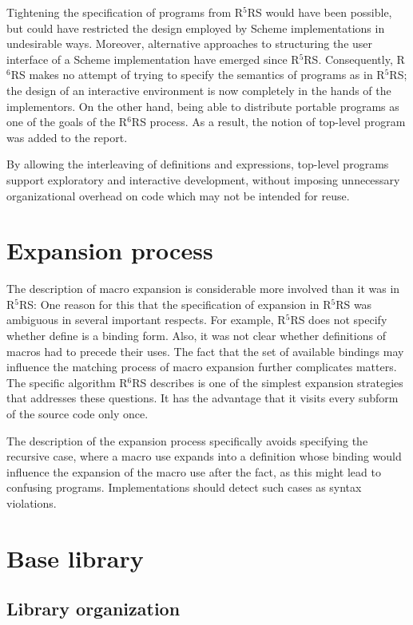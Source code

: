 \documentclass[twoside,twocolumn]{algol60}
\newcommand{\rn}[1]{R$^{#1}$RS}
\begin{document}
Tightening the specification of programs from \rn{5} would have been
possible, but could have restricted the design employed by Scheme
implementations in undesirable ways.  Moreover, alternative approaches
to structuring the user interface of a Scheme implementation have
emerged since \rn{5}.  Consequently, \rn{6} makes no attempt of trying
to specify the semantics of programs as in \rn{5}; the design of an
interactive environment is now completely in the hands of the
implementors.  On the other hand, being able to distribute portable
programs as one of the goals of the \rn{6} process.  As a result, the
notion of top-level program was added to the report.

By allowing the interleaving of definitions and expressions, top-level 
programs support exploratory and interactive development, without 
imposing unnecessary organizational overhead on code which may not be 
intended for reuse.

\chapter{Expansion process}

The description of macro expansion is considerable more involved than
it was in \rn{5}: One reason for this that the specification of
expansion in \rn{5} was ambiguous in several important respects.  For
example, \rn{5} does not specify whether {\cf define} is a binding
form.  Also, it was not clear whether definitions of macros had to
precede their uses.  The fact that the set of available bindings may
influence the matching process of macro expansion further complicates
matters.  The specific algorithm \rn{6} describes is one of the
simplest expansion strategies that addresses these questions.  It has
the advantage that it visits every subform of the source code only
once.

The description of the expansion process specifically avoids
specifying the recursive case, where a macro use expands into a
definition whose binding would influence the expansion of the macro
use after the fact, as this might lead to confusing programs.
Implementations should detect such cases as syntax violations.

\chapter{Base library}

\section{Library organization}
\end{document}
